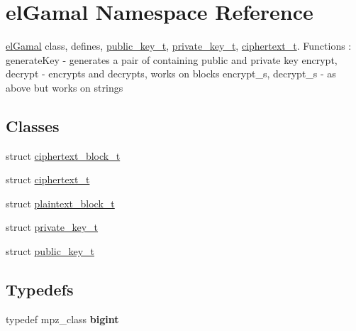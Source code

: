 \hypertarget{namespaceelGamal}{}\section{el\+Gamal Namespace Reference}
\label{namespaceelGamal}


\mbox{\hyperlink{namespaceelGamal}{el\+Gamal}} class, defines, \mbox{\hyperlink{structelGamal_1_1public__key__t}{public\+\_\+key\+\_\+t}}, \mbox{\hyperlink{structelGamal_1_1private__key__t}{private\+\_\+key\+\_\+t}}, \mbox{\hyperlink{structelGamal_1_1ciphertext__t}{ciphertext\+\_\+t}}. Functions \+: generate\+Key -\/ generates a pair of containing public and private key encrypt, decrypt -\/ encrypts and decrypts, works on blocks encrypt\+\_\+s, decrypt\+\_\+s -\/ as above but works on strings  


\subsection*{Classes}
\begin{DoxyCompactItemize}
\item 
struct \mbox{\hyperlink{structelGamal_1_1ciphertext__block__t}{ciphertext\+\_\+block\+\_\+t}}
\item 
struct \mbox{\hyperlink{structelGamal_1_1ciphertext__t}{ciphertext\+\_\+t}}
\item 
struct \mbox{\hyperlink{structelGamal_1_1plaintext__block__t}{plaintext\+\_\+block\+\_\+t}}
\item 
struct \mbox{\hyperlink{structelGamal_1_1private__key__t}{private\+\_\+key\+\_\+t}}
\item 
struct \mbox{\hyperlink{structelGamal_1_1public__key__t}{public\+\_\+key\+\_\+t}}
\end{DoxyCompactItemize}
\subsection*{Typedefs}
\begin{DoxyCompactItemize}
\item 
\mbox{\label{namespaceelGamal_ab2883bf41ce8d738e2428c8ae81b0245}} 
typedef mpz\+\_\+class {\bfseries bigint}
\end{DoxyCompactItemize}

